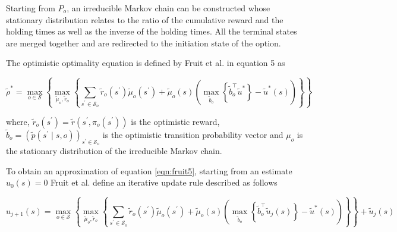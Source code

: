 Starting from $P_o$, an irreducible Markov chain can be constructed whose stationary distribution relates to the ratio of the cumulative reward and the holding times as well as the inverse of the holding times.
All the terminal states are merged together and are redirected to the initiation state of the option.

The optimistic optimality equation is defined by Fruit et al. \cite{fruit_regret_2017} in equation 5 as

\begin{equation}
    \label{eqn:fruit5}
    \tilde{\rho}^* = \max_{o \in \mathcal{S}} \left\{ \max_{\tilde{\mu}_o, \tilde{r}_o} \left\{ \sum_{s^\prime \in \mathcal{S}_o} \tilde{r}_o(s^\prime) \tilde{\mu}_o(s^\prime) + \tilde{\mu}_o(s) \left( \max_{\tilde{b}_o}\left\{ \tilde{b}_o^\top \tilde{u}^* \right\} - \tilde{u}^*(s) \right)  \right\} \right\}
\end{equation}

where, $ \tilde{r}_o(s^\prime) =  \tilde{r}(s^\prime, \pi_o(s^\prime))$ is the optimistic reward, $\tilde{b}_o = (\tilde{p}(s^\prime \mid s, o))_{s^\prime \in \mathcal{S}_o}$ is the optimistic transition probability vector and $\mu_o$ is the stationary distribution of the irreducible Markov chain.

To obtain an approximation of equation \ref{eqn:fruit5}, starting from an estimate $u_0(s) = 0$ Fruit et al. define an iterative update rule described as follows

\begin{equation}
    \label{eqn:fruit7}
    u_{j+1}(s) = \max_{o \in \mathcal{S}} \left\{ \max_{\tilde{\mu}_o, \tilde{r}_o} \left\{ \sum_{s^\prime \in \mathcal{S}_o} \tilde{r}_o(s^\prime) \tilde{\mu}_o(s^\prime) + \tilde{\mu}_o(s) \left( \max_{\tilde{b}_o}\left\{ \tilde{b}_o^\top \tilde{u}_j(s) \right\} - \tilde{u}^*(s) \right) \right\} \right\} + \tilde{u}_j(s)
\end{equation}

